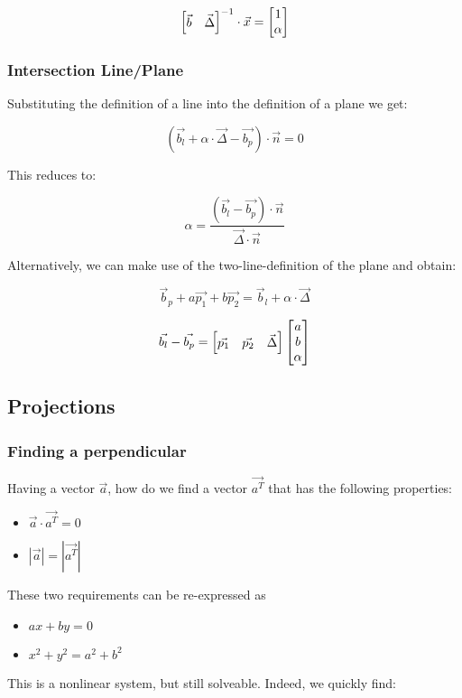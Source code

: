 $$
\begin{bmatrix}
    \vec{b} & \vec{\Delta}
\end{bmatrix}^{-1}
\cdot
\vec{x} = 
 \begin{bmatrix}  1 \\ \alpha  \\ \end{bmatrix} 
$$


\subsubsection{Intersection Line/Plane}

Substituting the definition of a line into the definition of a plane we get:

$$ ( \vec{b_l} + \alpha \cdot \vec{\Delta} - \vec{b_p} )\cdot \vec{n} = 0 $$

This reduces to: 

$$ \alpha = \frac{ ( \vec{b_l} - \vec{b_p} ) \cdot \vec{n} }{ \vec{\Delta} \cdot \vec{n} } $$

Alternatively, we can make use of the two-line-definition of the plane and obtain: 

$$ \vec{b}_p + a\vec{p_1} + b\vec{p_2} = \vec{b}_l + \alpha \cdot \vec{\Delta} $$

$$ \vec{b_l} - \vec{b_p} =  \begin{bmatrix}  \vec{p_1} & \vec{p_2} & \vec{\Delta}  \\ \end{bmatrix}   \begin{bmatrix} a \\ b \\ \alpha \\ \end{bmatrix}  $$

\subsection{Projections}

\subsubsection{Finding a perpendicular}

Having a vector $\vec{a}$, how do we find a vector $\vec{a^T}$ that has the following properties:
\begin{itemize}
    \item $ \vec{a} \cdot \vec{a^T} = 0 $
    \item $ | \vec{a} | = | \vec{a^T} | $
\end{itemize}

These two requirements can be re-expressed as 
\begin{itemize}
    \item $ ax + by = 0 $
    \item $ x^2 + y^2 = a^2 + b^2 $
\end{itemize}
This is a nonlinear system, but still solveable. Indeed, we quickly find: 

